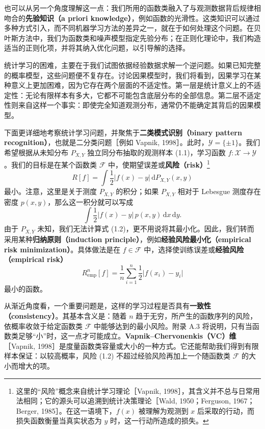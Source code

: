 也可以从另一个角度理解这一点：我们所用的函数类融入了与观测数据背后规律相吻合的\textbf{先验知识（a priori knowledge）}，例如函数的光滑性。这类知识可以通过多种方式引入，而不同机器学习方法的差异之一，就在于如何处理这个问题。在贝叶斯方法中，我们为函数类和噪声模型指定先验分布；在正则化理论中，我们构造适当的正则化项，并将其纳入优化问题，以引导解的选择。

统计学习的困难，主要在于我们试图依据经验数据求解一个逆问题。如果已知完整的概率模型，这些问题便不复存在。讨论因果模型时，我们将看到，因果学习在某种意义上更加困难，因为它存在两个层面的不适定性。第一层是统计意义上的不适定性：无论有限样本有多大，它都不可能包含底层分布的全部信息。第二层不适定性则来自这样一个事实：即使完全知道观测分布，通常仍不能确定其背后的因果模型。

下面更详细地考察统计学习问题，并聚焦于\textbf{二类模式识别（binary pattern recognition）}，也就是二分类问题［例如 Vapnik, 1998］。此时，$\mathcal{Y}=\{\pm1\}$。我们希望根据从未知分布 $P_{X,Y}$ 独立同分布抽取的观测样本 (1.1)，学习函数 $f\colon\mathcal{X}\to\mathcal{Y}$。我们的目标是在某个函数类 $\mathcal{F}$ 中，使期望误差或\textbf{风险（risk）}\footnote{这里的“风险”概念来自统计学习理论［Vapnik, 1998］，其含义并不总与日常用法相同；它的源头可以追溯到统计决策理论［Wald, 1950；Ferguson, 1967；Berger, 1985］。在这一语境下，$f(x)$ 被理解为观测到 $x$ 后采取的行动，而损失函数衡量当真实状态为 $y$ 时，这一行动所造成的损失。}
\begin{equation}
 R[f]=\int \frac{1}{2}\lvert f(x)-y\rvert\,\mathrm{d}P_{X,Y}(x,y)
 \tag{1.2}
\end{equation}
最小。注意，这里是关于测度 $P_{X,Y}$ 的积分；如果 $P_{X,Y}$ 相对于 Lebesgue 测度存在密度 $p(x,y)$，那么这一积分就可以写成
\[
 \int \frac{1}{2}\lvert f(x)-y\rvert\,p(x,y)\,\mathrm{d}x\,\mathrm{d}y.
\]
由于 $P_{X,Y}$ 未知，我们无法计算式 (1.2)，更不用说将其最小化。因此，我们转而采用某种\textbf{归纳原则（induction principle）}，例如\textbf{经验风险最小化（empirical risk minimization）}。具体做法是在 $f\in\mathcal{F}$ 中，选择使训练误差或\textbf{经验风险（empirical risk）}
\begin{equation}
 R^n_{\mathrm{emp}}[f]
 =\frac{1}{n}\sum_{i=1}^{n}\frac{1}{2}\lvert f(x_i)-y_i\rvert
 \tag{1.3}
\end{equation}
最小的函数。

从渐近角度看，一个重要问题是，这样的学习过程是否具有\textbf{一致性（consistency）}。其基本含义是：随着 $n$ 趋于无穷，所产生的函数序列的风险，依概率收敛于给定函数类 $\mathcal{F}$ 中能够达到的最小风险。附录 A.3 将说明，只有当函数类足够“小”时，这一点才可能成立。\textbf{Vapnik--Chervonenkis（VC）维}［Vapnik, 1998］是度量函数类容量或大小的一种方式。它还能帮助我们得到有限样本保证：以较高概率，风险 (1.2) 不超过经验风险再加上一个随函数类 $\mathcal{F}$ 的大小而增大的项。

